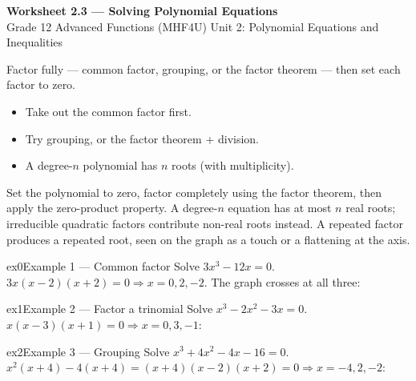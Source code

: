 \documentclass[11pt]{article}
\begin{document}
\begin{center}
{\LARGE\bfseries\color{titleblue}Worksheet 2.3 --- Solving Polynomial Equations}\\[2pt]
{\small Grade 12 Advanced Functions (MHF4U) \textperiodcentered{} Unit 2: Polynomial Equations and Inequalities}
\end{center}

\begin{ideabox}
Factor fully — common factor, grouping, or the factor theorem — then set each factor to zero.
\begin{itemize}[leftmargin=*,itemsep=2pt]
  \item Take out the common factor first.
  \item Try grouping, or the factor theorem + division.
  \item A degree-$n$ polynomial has $n$ roots (with multiplicity).
\end{itemize}
\end{ideabox}

\begin{learnbox}
Set the polynomial to zero, factor completely using the factor theorem, then apply the zero-product property.
A degree-$n$ equation has at most $n$ real roots; irreducible quadratic factors contribute non-real roots instead.
A repeated factor produces a repeated root, seen on the graph as a touch or a flattening at the axis.
\end{learnbox}


\begin{example}{ex0}{Example 1 --- Common factor}
Solve $3x^3-12x=0$.\soln $3x(x-2)(x+2)=0\Rightarrow x=0,2,-2$. The graph crosses at all three:
\end{example}

\begin{example}{ex1}{Example 2 --- Factor a trinomial}
Solve $x^3-2x^2-3x=0$.\soln $x(x-3)(x+1)=0\Rightarrow x=0,3,-1$:
\end{example}

\begin{example}{ex2}{Example 3 --- Grouping}
Solve $x^3+4x^2-4x-16=0$.\soln $x^2(x+4)-4(x+4)=(x+4)(x-2)(x+2)=0\Rightarrow x=-4,2,-2$:
\end{example}
\end{document}
